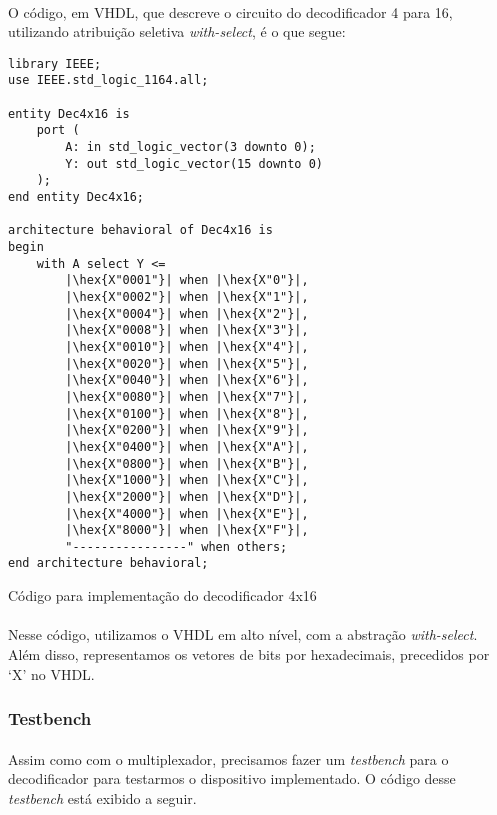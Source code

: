\documentclass[a4paper,12pt]{article}
\newenvironment{code}{\captionsetup{type=listing}}{}
\newcommand{\hex}[1]{\textcolor{green!50!black}{#1}}
\begin{document}
\paragraph{}
O código, em VHDL, que descreve o circuito do decodificador 4 para 16, utilizando atribuição seletiva \textit{with-select}, é o que segue:

\begin{code}
\begin{verbatim}
library IEEE;
use IEEE.std_logic_1164.all;

entity Dec4x16 is
    port (
        A: in std_logic_vector(3 downto 0);
        Y: out std_logic_vector(15 downto 0)
    );
end entity Dec4x16;

architecture behavioral of Dec4x16 is
begin
    with A select Y <=
        |\hex{X"0001"}| when |\hex{X"0"}|,
        |\hex{X"0002"}| when |\hex{X"1"}|,
        |\hex{X"0004"}| when |\hex{X"2"}|,
        |\hex{X"0008"}| when |\hex{X"3"}|,
        |\hex{X"0010"}| when |\hex{X"4"}|,
        |\hex{X"0020"}| when |\hex{X"5"}|,
        |\hex{X"0040"}| when |\hex{X"6"}|,
        |\hex{X"0080"}| when |\hex{X"7"}|,
        |\hex{X"0100"}| when |\hex{X"8"}|,
        |\hex{X"0200"}| when |\hex{X"9"}|,
        |\hex{X"0400"}| when |\hex{X"A"}|,
        |\hex{X"0800"}| when |\hex{X"B"}|,
        |\hex{X"1000"}| when |\hex{X"C"}|,
        |\hex{X"2000"}| when |\hex{X"D"}|,
        |\hex{X"4000"}| when |\hex{X"E"}|,
        |\hex{X"8000"}| when |\hex{X"F"}|,
        "----------------" when others;
end architecture behavioral;
\end{verbatim}
\vspace{-20pt}
\caption{Código para implementação do decodificador 4x16}
\vspace{-10pt}
\end{code}

\paragraph{}
Nesse código, utilizamos o VHDL em alto nível, com a abstração \textit{with-select}. Além disso, representamos os vetores de bits por hexadecimais, precedidos por `X' no VHDL.

\subsubsection{Testbench}
\paragraph{}
Assim como com o multiplexador, precisamos fazer um \textit{testbench} para o decodificador para testarmos o dispositivo implementado. O código desse \textit{testbench} está exibido a seguir.
\end{document}
